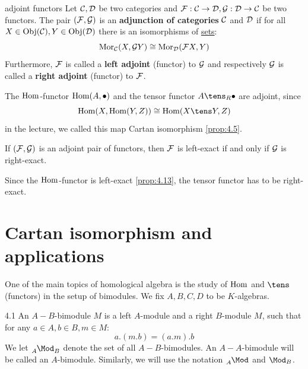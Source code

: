 \documentclass[twoside = false,	%
		headsepline,		%
		parskip = true,
		]{scrbook}						%
\begin{document}
        \begin{definition*}{adjoint functors}
            Let $\mathcal C,\mathcal D$ be two categories and $\mathcal F: \mathcal C \to \mathcal D, \mathcal G: \mathcal D \to \mathcal C$ be two functors. The pair $(\mathcal F,\mathcal G)$ is an \textbf{adjunction of categories} $\mathcal C$ and $\mathcal D$ if for all $X \in \mathrm{Obj}(\mathcal C), Y \in \mathrm{Obj}(\mathcal D)$ there is an isomorphisms of \underline{sets}:
            \begin{equation*}
                \mathrm{Mor}_\mathcal C(X,\mathcal G Y) \cong \mathrm{Mor}_\mathcal D(\mathcal F X,Y)
            \end{equation*}
            Furthermore, $\mathcal F$ is called a \textbf{left adjoint} (functor) to $\mathcal G$ and respectively $\mathcal G$ is called a \textbf{right adjoint} (functor) to $\mathcal F$.
        \end{definition*}
        
        The $\mathrm{Hom}$-functor $\mathrm{Hom}(A,\bullet)$ and the tensor functor $A \tens_R \bullet$ are adjoint, since
        \begin{equation*}
            \Hom(X,\Hom(Y,Z)) \cong \Hom(X \tens Y, Z)
        \end{equation*}
        in the lecture, we called this map Cartan isomorphism \ref{prop:4.5}.
        
        \begin{lemma*}{}
            If $(\mathcal F,\mathcal G)$ is an adjoint pair of functors, then $\mathcal F$ is left-exact if and only if $\mathcal G$ is right-exact.
        \end{lemma*}
        
        Since the $\mathrm{Hom}$-functor is left-exact \ref{prop:4.13}, the tensor functor has to be right-exact. 
\section{Cartan isomorphism and applications}

    One of the main topics of homological algebra is the study of $\mathrm{Hom}$ and $\tens$ (functors) in the setup of bimodules. We fix $A,B,C,D$ to be $K$-algebras.

    \begin{definition}{}{4.1}
        An $A-B$-bimodule $M$ is a left $A$-module and a right $B$-module $M$, such that for any $a \in A, b \in B, m \in M$:
        \begin{equation*}
            a.(m.b) = (a.m).b
        \end{equation*}
        We let $\tensor[_A]{\Mod}{_B}$ denote the set of all $A-B$-bimodules. An $A-A$-bimodule will be called an $A$-bimodule. Similarly, we will use the notation $\tensor[_A]{\Mod}{^{}}$ and $\Mod_B$.
    \end{definition}
\end{document}
